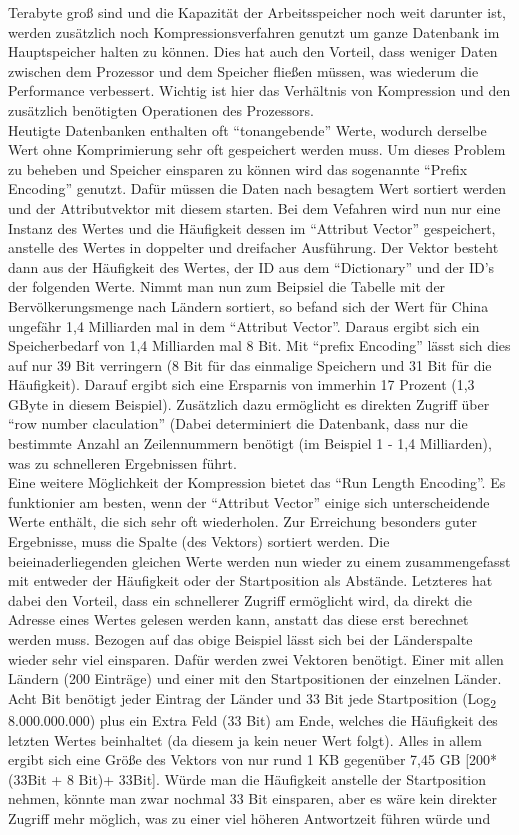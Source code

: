 \documentclass[a4paper, 12pt]{scrartcl}
\begin{document}
Terabyte groß sind und die Kapazität der Arbeitsspeicher noch weit darunter ist, werden zusätzlich noch Kompressionsverfahren genutzt um ganze Datenbank im Hauptspeicher halten zu können. Dies hat auch den Vorteil, dass weniger Daten zwischen dem Prozessor und dem Speicher fließen müssen, was wiederum die Performance verbessert. Wichtig ist hier das Verhältnis von Kompression und den zusätzlich benötigten Operationen des Prozessors. \\ Heutigte Datenbanken enthalten oft "`tonangebende"' Werte, wodurch derselbe Wert ohne Komprimierung sehr oft gespeichert werden muss. Um dieses Problem zu beheben und Speicher einsparen zu können wird das sogenannte "`Prefix Encoding"' genutzt. Dafür müssen die Daten nach besagtem Wert sortiert werden und der Attributvektor mit diesem starten. Bei dem Vefahren wird nun nur eine Instanz des Wertes und die Häufigkeit dessen im "`Attribut Vector"' gespeichert, anstelle des Wertes in doppelter und dreifacher Ausführung. Der Vektor besteht dann aus der Häufigkeit des Wertes, der ID aus dem "`Dictionary"' und der ID's der folgenden Werte. Nimmt man nun zum Beipsiel die Tabelle mit der Bervölkerungsmenge nach Ländern sortiert, so befand sich der Wert für China ungefähr 1,4 Milliarden mal in dem "`Attribut Vector"'. Daraus ergibt sich ein Speicherbedarf von 1,4 Milliarden mal 8 Bit. Mit "`prefix Encoding"' lässt sich dies auf nur 39 Bit verringern (8 Bit für das einmalige Speichern und 31 Bit für die Häufigkeit). Darauf ergibt sich eine Ersparnis von immerhin 17 Prozent (1,3 GByte in diesem Beispiel). Zusätzlich dazu ermöglicht es direkten Zugriff über "`row number claculation"' (Dabei determiniert die Datenbank, dass nur die bestimmte Anzahl an Zeilennummern benötigt (im Beispiel 1 - 1,4 Milliarden), was zu schnelleren Ergebnissen führt. \\ Eine weitere Möglichkeit der Kompression bietet das "`Run Length Encoding"'. Es funktionier am besten, wenn der "`Attribut Vector"' einige sich unterscheidende Werte enthält, die sich sehr oft wiederholen. Zur Erreichung besonders guter Ergebnisse, muss die Spalte (des Vektors) sortiert werden. Die beieinaderliegenden gleichen Werte werden nun wieder zu einem zusammengefasst mit entweder der Häufigkeit oder der Startposition als Abstände. Letzteres hat dabei den Vorteil, dass ein schnellerer Zugriff ermöglicht wird, da direkt die Adresse eines Wertes gelesen werden kann, anstatt das diese erst berechnet werden muss. Bezogen auf das obige Beispiel lässt sich bei der Länderspalte wieder sehr viel einsparen. Dafür werden zwei Vektoren benötigt. Einer mit allen Ländern (200 Einträge) und einer mit den Startpositionen der einzelnen Länder. Acht Bit benötigt jeder Eintrag der Länder und 33 Bit jede Startposition (Log\textsubscript{2} 8.000.000.000) plus ein Extra Feld (33 Bit) am Ende, welches die Häufigkeit des letzten Wertes beinhaltet (da diesem ja kein neuer Wert folgt). Alles in allem ergibt sich eine Größe des Vektors von nur rund 1 KB gegenüber 7,45 GB [200*(33Bit + 8 Bit)+ 33Bit]. Würde man die Häufigkeit anstelle der Startposition nehmen, könnte man zwar nochmal 33 Bit einsparen, aber es wäre kein direkter Zugriff mehr möglich, was zu einer viel höheren Antwortzeit führen würde und 
\end{document}
